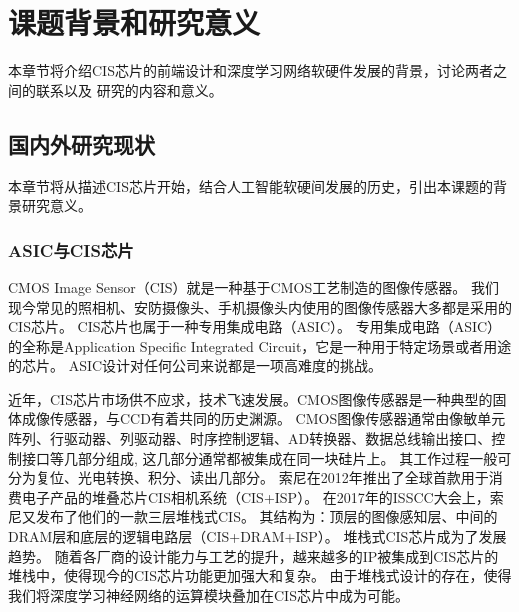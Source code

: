 
\chapter{课题背景和研究意义}

本章节将介绍CIS芯片的前端设计和深度学习网络软硬件发展的背景，讨论两者之间的联系以及
研究的内容和意义。

\section{国内外研究现状}
本章节将从描述CIS芯片开始，结合人工智能软硬间发展的历史，引出本课题的背景研究意义。


\subsection{ASIC与CIS芯片}
CMOS Image Sensor（CIS）就是一种基于CMOS工艺制造的图像传感器。
我们现今常见的照相机、安防摄像头、手机摄像头内使用的图像传感器大多都是采用的CIS芯片。
CIS芯片也属于一种专用集成电路（ASIC）。
专用集成电路（ASIC）的全称是Application Specific Integrated Circuit，它是一种用于特定场景或者用途的芯片。
ASIC设计对任何公司来说都是一项高难度的挑战。  

近年，CIS芯片市场供不应求，技术飞速发展。CMOS图像传感器是一种典型的固体成像传感器，与CCD有着共同的历史渊源。
CMOS图像传感器通常由像敏单元阵列、行驱动器、列驱动器、时序控制逻辑、AD转换器、数据总线输出接口、控制接口等几部分组成, 这几部分通常都被集成在同一块硅片上。
其工作过程一般可分为复位、光电转换、积分、读出几部分。  
索尼在2012年推出了全球首款用于消费电子产品的堆叠芯片CIS相机系统（CIS+ISP）。
在2017年的ISSCC大会上，索尼又发布了他们的一款三层堆栈式CIS。\parencite{sony2017} %
其结构为：顶层的图像感知层、中间的DRAM层和底层的逻辑电路层（CIS+DRAM+ISP）。
堆栈式CIS芯片成为了发展趋势。
随着各厂商的设计能力与工艺的提升，越来越多的IP被集成到CIS芯片的堆栈中，使得现今的CIS芯片功能更加强大和复杂。
由于堆栈式设计的存在，使得我们将深度学习神经网络的运算模块叠加在CIS芯片中成为可能。  

